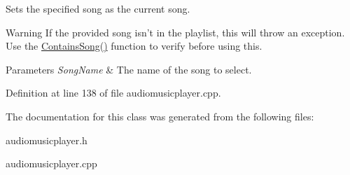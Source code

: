 Sets the specified song as the current song. 

\begin{DoxyWarning}{Warning}
If the provided song isn't in the playlist, this will throw an exception. Use the \hyperlink{classMezzanine_1_1Audio_1_1MusicPlayer_a0008726842f3562c1c6de2885dd0c837}{ContainsSong()} function to verify before using this. 
\end{DoxyWarning}

\begin{DoxyParams}{Parameters}
{\em SongName} & The name of the song to select. \\
\hline
\end{DoxyParams}


Definition at line 138 of file audiomusicplayer.cpp.



The documentation for this class was generated from the following files:\begin{DoxyCompactItemize}
\item 
audiomusicplayer.h\item 
audiomusicplayer.cpp\end{DoxyCompactItemize}

